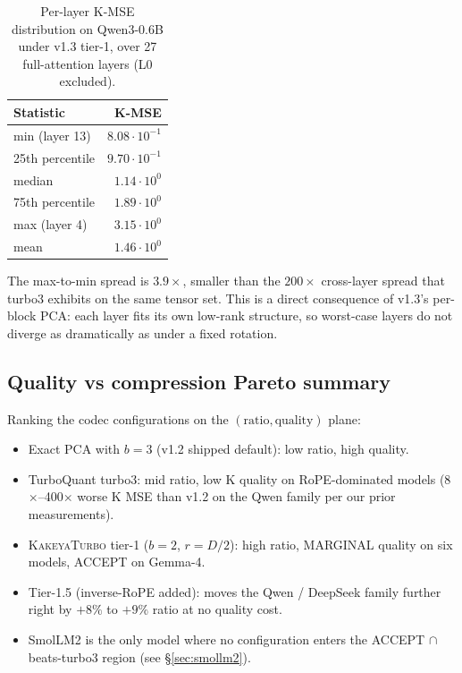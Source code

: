 \documentclass[11pt,a4paper]{article}
\theoremstyle{definition}
\theoremstyle{plain}
\begin{document}
\begin{table}[H]
\centering
\small
\caption{Per-layer K-MSE distribution on Qwen3-0.6B under v1.3 tier-1, over 27 full-attention layers (L0 excluded).}
\label{tab:mse-perlayer}
\begin{tabular}{lr}
  \toprule
  Statistic & K-MSE \\
  \midrule
  min (layer 13) & $8.08\!\cdot\!10^{-1}$ \\
  25th percentile & $9.70\!\cdot\!10^{-1}$ \\
  median          & $1.14\!\cdot\!10^{0}$  \\
  75th percentile & $1.89\!\cdot\!10^{0}$  \\
  max (layer 4)   & $3.15\!\cdot\!10^{0}$  \\
  mean            & $1.46\!\cdot\!10^{0}$  \\
  \bottomrule
\end{tabular}
\end{table}

The max-to-min spread is $3.9\times$, smaller than the $200\times$ cross-layer spread that turbo3 exhibits on the same tensor set. This is a direct consequence of v1.3's per-block PCA: each layer fits its own low-rank structure, so worst-case layers do not diverge as dramatically as under a fixed rotation.

\subsection{Quality vs compression Pareto summary}

Ranking the codec configurations on the $(\text{ratio}, \text{quality})$ plane:
\begin{itemize}[leftmargin=*]
  \item Exact PCA with $b=3$ (v1.2 shipped default): low ratio, high quality.
  \item TurboQuant turbo3: mid ratio, low K quality on RoPE-dominated models (8$\times$--400$\times$ worse K MSE than v1.2 on the Qwen family per our prior measurements).
  \item \textsc{KakeyaTurbo} tier-1 ($b=2$, $r=D/2$): high ratio, MARGINAL quality on six models, ACCEPT on Gemma-4.
  \item Tier-1.5 (inverse-RoPE added): moves the Qwen / DeepSeek family further right by $+8\%$ to $+9\%$ ratio at no quality cost.
  \item SmolLM2 is the only model where no configuration enters the ACCEPT $\cap$ beats-turbo3 region (see \S\ref{sec:smollm2}).
\end{itemize}
\end{document}
